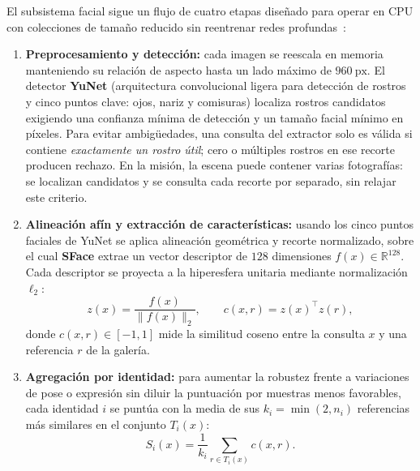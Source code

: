 \documentclass[11pt,a4paper]{article}
\begin{document}
El subsistema facial sigue un flujo de cuatro etapas diseñado para operar en
CPU con colecciones de tamaño reducido sin reentrenar redes profundas~\cite{opencv}:

\begin{enumerate}
  \item \textbf{Preprocesamiento y detección:} cada imagen se reescala en
  memoria manteniendo su relación de aspecto hasta un lado máximo de
  $960\ \mathrm{px}$. El detector \textbf{YuNet} (arquitectura convolucional
  ligera para detección de rostros y cinco puntos clave: ojos, nariz y
  comisuras) localiza rostros candidatos exigiendo una confianza mínima de
  detección y un tamaño facial mínimo en píxeles. Para evitar ambigüedades, una
  consulta del extractor solo es válida si contiene \emph{exactamente un rostro
  útil}; cero o múltiples rostros en ese recorte producen rechazo. En la misión,
  la escena puede contener varias fotografías: se localizan candidatos y se
  consulta cada recorte por separado, sin relajar este criterio.

  \item \textbf{Alineación afín y extracción de características:} usando los
  cinco puntos faciales de YuNet se aplica alineación geométrica y recorte
  normalizado, sobre el cual \textbf{SFace} extrae un vector descriptor de
  $128$ dimensiones $f(x)\in\mathbb{R}^{128}$. Cada descriptor se proyecta a la
  hiperesfera unitaria mediante normalización $\ell_2$:
  \begin{equation}
    z(x)=\frac{f(x)}{\lVert f(x)\rVert_2},
    \qquad c(x,r)=z(x)^\top z(r),
    \label{eq:coseno}
  \end{equation}
  donde $c(x,r)\in[-1,1]$ mide la similitud coseno entre la consulta $x$ y una
  referencia $r$ de la galería.

  \item \textbf{Agregación por identidad:} para aumentar la robustez frente a
  variaciones de pose o expresión sin diluir la puntuación por muestras menos
  favorables, cada identidad $i$ se puntúa con la media de sus $k_i=\min(2,n_i)$
  referencias más similares en el conjunto $T_i(x)$:
  \begin{equation}
    S_i(x)=\frac{1}{k_i}\sum_{r\in T_i(x)}c(x,r).
  \end{equation}


\end{enumerate}
\end{document}
